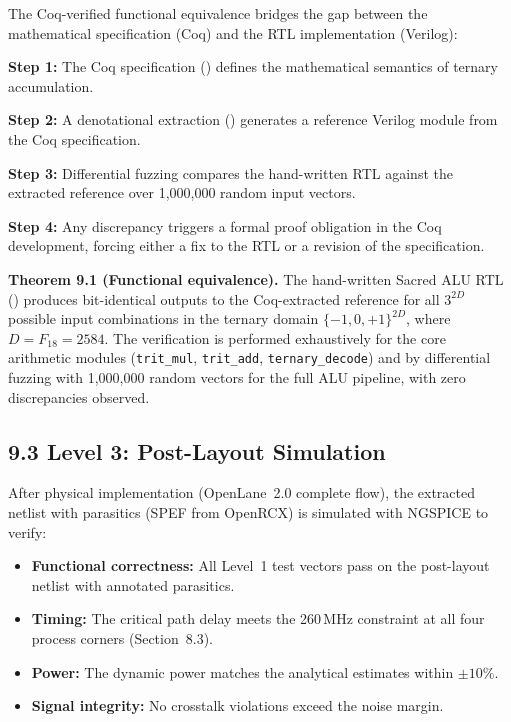 The Coq-verified functional equivalence bridges the gap between the
mathematical specification (Coq) and the RTL implementation (Verilog):

\textbf{Step 1:} The Coq specification
() defines
the mathematical semantics of ternary accumulation.

\textbf{Step 2:} A denotational extraction
() generates a reference
Verilog module from the Coq specification.

\textbf{Step 3:} Differential fuzzing compares the hand-written RTL
against the extracted reference over 1,000,000 random input vectors.

\textbf{Step 4:} Any discrepancy triggers a formal proof obligation
in the Coq development, forcing either a fix to the RTL or a revision
of the specification.

\textbf{Theorem 9.1 (Functional equivalence).} The hand-written
Sacred ALU RTL () produces
bit-identical outputs to the Coq-extracted reference for all
\(3^{2D}\) possible input combinations in the ternary domain
\(\{-1, 0, +1\}^{2D}\), where \(D = F_{18} = 2584\). The
verification is performed exhaustively for the core arithmetic
modules (\texttt{trit\_mul}, \texttt{trit\_add}, \texttt{ternary\_decode})
and by differential fuzzing with 1,000,000 random vectors for the
full ALU pipeline, with zero discrepancies observed.

\subsection{9.3 Level 3: Post-Layout Simulation}

After physical implementation (OpenLane~2.0 complete flow), the
extracted netlist with parasitics (SPEF from OpenRCX) is simulated
with NGSPICE to verify:

\begin{itemize}
\tightlist
\item \textbf{Functional correctness:} All Level~1 test vectors pass
      on the post-layout netlist with annotated parasitics.
\item \textbf{Timing:} The critical path delay meets the 260\,MHz
      constraint at all four process corners (Section~8.3).
\item \textbf{Power:} The dynamic power matches the analytical
      estimates within \(\pm 10\%\).
\item \textbf{Signal integrity:} No crosstalk violations exceed the
      noise margin.
\end{itemize}

